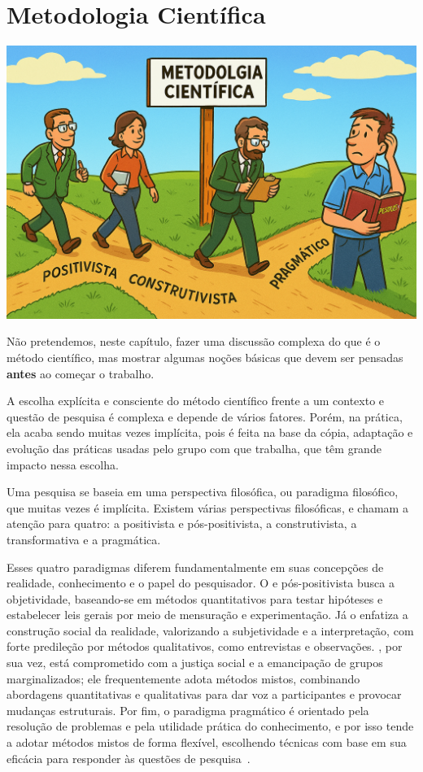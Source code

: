 \chapter{Metodologia Científica}

\begin{center}
\includegraphics[width=0.5\linewidth]{Images/metodologia.png}    
\end{center}
\vspace{0.5cm}



Não pretendemos, neste capítulo, fazer uma discussão complexa do que é o método científico, mas mostrar algumas noções básicas que devem ser pensadas \textbf{antes} ao começar o trabalho. 

A escolha explícita e consciente do método científico frente a um contexto e questão de pesquisa é complexa e depende de vários fatores. 
Porém, na prática, ela acaba sendo muitas vezes implícita, pois é feita na base da cópia, adaptação e evolução das práticas usadas pelo grupo com que trabalha, que têm grande impacto nessa escolha. 

Uma pesquisa se baseia em uma perspectiva filosófica, ou paradigma filosófico, que muitas vezes é implícita. 
Existem várias perspectivas filosóficas, e \citet{creswell2021projeto} chamam a atenção para quatro: a positivista e pós-positivista, a construtivista, a transformativa e a pragmática. 

Esses quatro paradigmas diferem fundamentalmente em suas concepções de realidade, conhecimento e o papel do pesquisador. O  e pós-positivista busca a objetividade, baseando-se em métodos quantitativos para testar hipóteses e estabelecer leis gerais por meio de mensuração e experimentação. Já o  enfatiza a construção social da realidade, valorizando a subjetividade e a interpretação, com forte predileção por métodos qualitativos, como entrevistas e observações. , por sua vez, está comprometido com a justiça social e a emancipação de grupos marginalizados; ele frequentemente adota métodos mistos, combinando abordagens quantitativas e qualitativas para dar voz a participantes e provocar mudanças estruturais. Por fim, o paradigma pragmático é orientado pela resolução de problemas e pela utilidade prática do conhecimento, e por isso tende a adotar métodos mistos de forma flexível, escolhendo técnicas com base em sua eficácia para responder às questões de pesquisa~\citet{creswell2021projeto}.

